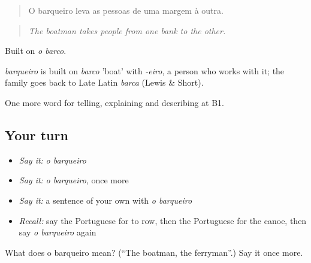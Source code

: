 \begin{quote}
O barqueiro leva as pessoas de uma margem à outra.
\end{quote}

\begin{quote}
\emph{The boatman takes people from one bank to the other.}
\end{quote}

Built on \emph{o barco}.

\begin{cousinweb}
\emph{barqueiro} is built on \emph{barco} 'boat' with \emph{-eiro}, a person who works with it; the family goes back to Late Latin \emph{barca} (Lewis \& Short).
\end{cousinweb}

\begin{grammarlens}[title={What you've built}]
One more word for telling, explaining and describing at B1.
\end{grammarlens}

\subsection*{Your turn}
\begin{itemize}
\raggedright
  \item \emph{Say it:} \emph{o barqueiro}
  \item \emph{Say it:} \emph{o barqueiro}, once more
  \item \emph{Say it:} a sentence of your own with \emph{o barqueiro}
  \item \emph{Recall:} say the Portuguese for to row, then the Portuguese for the canoe, then say \emph{o barqueiro} again
\end{itemize}

\begin{tcolorbox}[breakable,colback=teal!4,colframe=teal!35!black,title={Before you move on}]
What does o barqueiro mean? (\textquotedblleft{}The boatman, the ferryman\textquotedblright{}.) Say it once more.
\end{tcolorbox}
